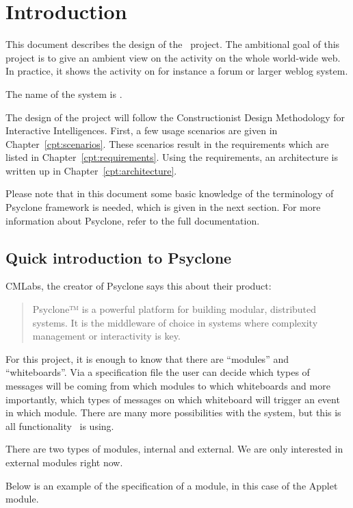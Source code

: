 \chapter{Introduction}

This document describes the design of the \AmbE\ project. The ambitional goal
of this project is to give an ambient view on the activity on the whole
world-wide web. In practice, it shows the activity on for instance a forum or
larger weblog system.

The name of the system is \Amber{}.

The design of the project will follow the Constructionist Design Methodology
for Interactive Intelligences\cite{CDM}. First, a few usage scenarios are given
in Chapter~\ref{cpt:scenarios}. These scenarios result in the requirements
which are listed in Chapter~\ref{cpt:requirements}. Using the requirements, an
architecture is written up in Chapter~\ref{cpt:architecture}.

Please note that in this document some basic knowledge of the terminology of
Psyclone framework is needed, which is given in the next section. For more
information about Psyclone, refer to the full
documentation\cite{PsycloneManual}.

\section{Quick introduction to Psyclone}

CMLabs, the creator of Psyclone says this about their product:

\begin{quote}
  Psyclone™ is a powerful platform for building modular, distributed systems.
  It is the middleware of choice in systems where complexity management or
  interactivity is key.
\end{quote}

For this project, it is enough to know that there are ``modules'' and
``whiteboards''. Via a specification file the user can decide which types of
messages will be coming from which modules to which whiteboards and more
importantly, which types of messages on which whiteboard will trigger an event
in which module. There are many more possibilities with the system, but this is
all functionality \Amber\ is using.

There are two types of modules, internal and external. We are only interested
in external modules right now.

Below is an example of the specification of a module, in this case of the
Applet module. 

